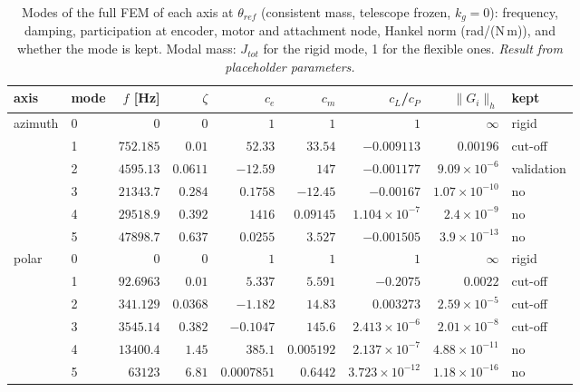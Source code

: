 \documentclass[10pt,a4paper]{article}
\numberwithin{equation}{section}
\begin{document}
\begin{table}[H]\centering\small
\caption{Modes of the full FEM of each axis at $\theta_{ref}$ (consistent mass, telescope frozen, $k_g = 0$): frequency, damping, participation at encoder, motor and attachment node, Hankel norm (rad/(N\,m)), and whether the mode is kept. Modal mass: $J_{tot}$ for the rigid mode, 1 for the flexible ones. \emph{Result from placeholder parameters.}}\label{tab:modal_modes}
\begin{tabular}{llrrrrrrl}\toprule
axis & mode & $f$ [Hz] & $\zeta$ & $c_e$ & $c_m$ & $c_{L}$/$c_P$ & $\|G_i\|_h$ & kept \\ \midrule
azimuth & 0 & $0$ & $0$ & $1$ & $1$ & $1$ & $\infty$ & rigid \\
 & 1 & $752.185$ & $0.01$ & $52.33$ & $33.54$ & $-0.009113$ & $0.00196$ & cut-off \\
 & 2 & $4595.13$ & $0.0611$ & $-12.59$ & $147$ & $-0.001177$ & $9.09\times10^{-6}$ & validation \\
 & 3 & $21343.7$ & $0.284$ & $0.1758$ & $-12.45$ & $-0.00167$ & $1.07\times10^{-10}$ & no \\
 & 4 & $29518.9$ & $0.392$ & $1416$ & $0.09145$ & $1.104\times10^{-7}$ & $2.4\times10^{-9}$ & no \\
 & 5 & $47898.7$ & $0.637$ & $0.0255$ & $3.527$ & $-0.001505$ & $3.9\times10^{-13}$ & no \\
\midrule
polar & 0 & $0$ & $0$ & $1$ & $1$ & $1$ & $\infty$ & rigid \\
 & 1 & $92.6963$ & $0.01$ & $5.337$ & $5.591$ & $-0.2075$ & $0.0022$ & cut-off \\
 & 2 & $341.129$ & $0.0368$ & $-1.182$ & $14.83$ & $0.003273$ & $2.59\times10^{-5}$ & cut-off \\
 & 3 & $3545.14$ & $0.382$ & $-0.1047$ & $145.6$ & $2.413\times10^{-6}$ & $2.01\times10^{-8}$ & cut-off \\
 & 4 & $13400.4$ & $1.45$ & $385.1$ & $0.005192$ & $2.137\times10^{-7}$ & $4.88\times10^{-11}$ & no \\
 & 5 & $63123$ & $6.81$ & $0.0007851$ & $0.6442$ & $3.723\times10^{-12}$ & $1.18\times10^{-16}$ & no \\

\bottomrule\end{tabular}\end{table}
\end{document}
